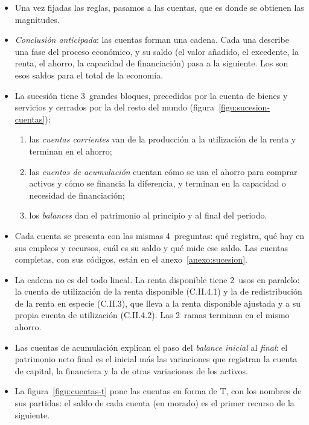 \documentclass[11pt]{article}
\begin{document}
\begin{itemize}
\item Una vez fijadas las reglas, pasamos a las cuentas, que es donde se obtienen las magnitudes.
\item \emph{Conclusión anticipada}: las cuentas forman una cadena. Cada una describe una fase del proceso económico, y su saldo (el valor añadido, el excedente, la renta, el ahorro, la capacidad de financiación) pasa a la siguiente. Los  son esos saldos para el total de la economía.
\item La sucesión tiene 3~grandes bloques, precedidos por la cuenta de bienes y servicios y cerrados por la del resto del mundo (figura~\ref{figu:sucesion-cuentas}):
  \begin{enumerate}
  \item las \emph{cuentas corrientes} van de la producción a la utilización de la renta y terminan en el ahorro;
  \item las \emph{cuentas de acumulación} cuentan cómo se usa el ahorro para comprar activos y cómo se financia la diferencia, y terminan en la capacidad o necesidad de financiación;
  \item los \emph{balances} dan el patrimonio al principio y al final del periodo.
  \end{enumerate}
\item Cada cuenta se presenta con las mismas 4~preguntas: qué registra, qué hay en sus empleos y recursos, cuál es su saldo y qué mide ese saldo. Las cuentas completas, con sus códigos, están en el anexo~\ref{anexo:sucesion}.
\end{itemize}

\begin{infografia}[H]
\centering
\caption{La sucesión de cuentas y sus saldos}\label{figu:sucesion-cuentas}
\end{infografia}

\begin{itemize}
\item La cadena no es del todo lineal. La renta disponible tiene 2~usos en paralelo: la cuenta de utilización de la renta disponible (C.II.4.1) y la de redistribución de la renta en especie (C.II.3), que lleva a la renta disponible ajustada y a su propia cuenta de utilización (C.II.4.2). Las 2~ramas terminan en el mismo ahorro.
\item Las cuentas de acumulación explican el paso del \emph{balance inicial} al \emph{final}: el patrimonio neto final es el inicial más las variaciones que registran la cuenta de capital, la financiera y la de otras variaciones de los activos.
\item La figura~\ref{figu:cuentas-t} pone las cuentas en forma de T, con los nombres de sus partidas: el saldo de cada cuenta (en morado) es el primer recurso de la siguiente.
\end{itemize}
\end{document}
